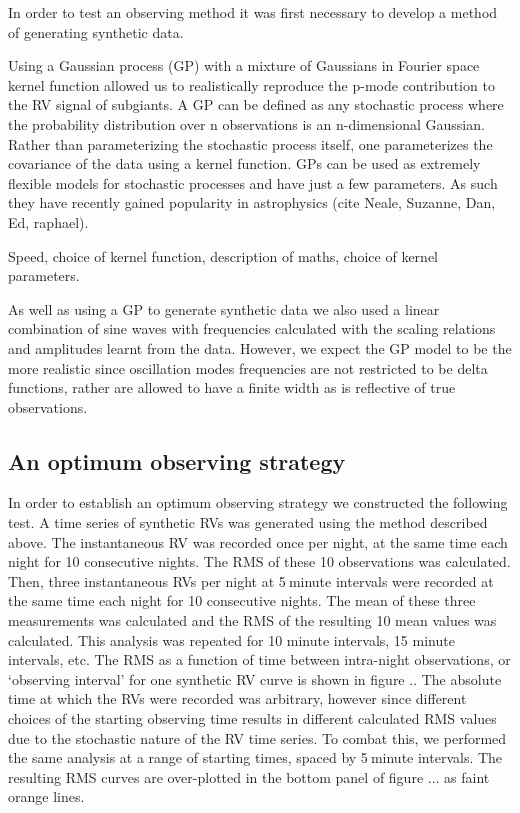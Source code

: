 \documentclass[useAMS, usenatbib]{aastex}
\newcommand{\integer}{5}
\begin{document}

In order to test an observing method it was first necessary to develop a method
of generating synthetic data.

Using a Gaussian process (GP) with a mixture of Gaussians in Fourier space
kernel function allowed us to realistically reproduce the p-mode contribution
to the RV signal of subgiants.
A GP can be defined as any stochastic process
where the probability distribution over n observations is an n-dimensional
Gaussian.
Rather than parameterizing the stochastic process itself, one parameterizes the
covariance of the data using a kernel function.
GPs can be used as extremely flexible models for stochastic processes and have
just a few parameters.
As such they have recently gained popularity in astrophysics (cite Neale,
Suzanne, Dan, Ed, raphael).

Speed, choice of kernel function, description of maths, choice of kernel
parameters.

As well as using a GP to generate synthetic data we also used a linear
combination of sine waves with frequencies calculated with the
\citet{Kjeldsen1995} scaling relations and amplitudes learnt from the data.
However, we expect the GP model to be the more realistic since oscillation
modes frequencies are not restricted to be delta functions, rather are allowed
to have a finite width as is reflective of true observations.

\subsection{An optimum observing strategy}
\label{sub:optimum}

In order to establish an optimum observing strategy we constructed the
following test.
A time series of synthetic RVs was generated using the method described above.
The instantaneous RV was recorded once per night, at the same time each night
for 10 consecutive nights.
The RMS of these 10 observations was calculated.
Then, three instantaneous RVs per night at \integer$~$minute intervals were
recorded at the same time each night for 10 consecutive nights.
The mean of these three measurements was calculated and the RMS of the
resulting 10 mean values was calculated.
This analysis was repeated for 10 minute intervals, 15 minute intervals, etc.
The RMS as a function of time between intra-night observations, or
`observing interval' for one synthetic RV curve is shown in figure ..
The absolute time at which the RVs were recorded was arbitrary, however since
different choices of the starting observing time results in different
calculated RMS values due to the stochastic nature of the RV time series.
To combat this, we performed the same analysis at a range of
starting times, spaced by \integer$~$minute intervals.
The resulting RMS curves are over-plotted in the bottom panel of figure ...
as faint orange lines.
\end{document}

